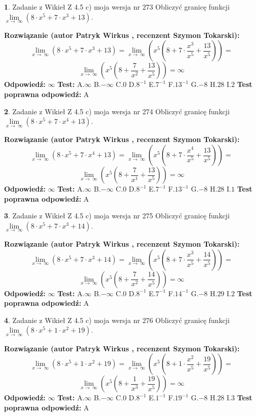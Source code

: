 \documentclass[12pt, a4paper]{article}
\theoremstyle{definition} %
\newtheorem{zad}{}
\newcommand{\zadStart}[1]{\begin{zad}#1\newline}
\newcommand{\zadStop}{\end{zad}}
\newcommand{\rozwStart}[2]{\noindent \textbf{Rozwiązanie (autor #1 , recenzent #2): }\newline}
\newcommand{\rozwStop}{\newline}
\newcommand{\odpStart}{\noindent \textbf{Odpowiedź:}\newline}
\newcommand{\odpStop}{\newline}
\newcommand{\testStart}{\noindent \textbf{Test:}\newline}
\newcommand{\testStop}{\newline}
\newcommand{\kluczStart}{\noindent \textbf{Test poprawna odpowiedź:}\newline}
\newcommand{\kluczStop}{\newline}
\begin{document}
\zadStart{Zadanie z Wikieł Z 4.5 c) moja wersja nr 273}
Obliczyć granicę funkcji  $\lim\limits_{x\to\ \infty}(8 \cdot x^{5}+7 \cdot x^{3}+13)$.
\zadStop
\rozwStart{Patryk Wirkus}{Szymon Tokarski}
$$\lim\limits_{x\to\ \infty}(8 \cdot x^{5}+7 \cdot x^{3}+13) = \lim\limits_{x\to\ \infty}(x^{5}(8 +7 \cdot \frac{x^{3}}{x^{5}}+\frac{13}{x^{5}})) =$$ $$\lim\limits_{x\to\ \infty}(x^{5}(8 +\frac{7}{x^{2}}+\frac{13}{x^{5}})) =\infty$$
\rozwStop
\odpStart
$\infty$
\odpStop
\testStart
A.$\infty$ B.$-\infty$ C.$0$ D.$8^{-1}$ E.$7^{-1}$
F.$13^{-1}$ G.$-8$
H.$28$
I.$2$
\testStop
\kluczStart
A
\kluczStop



\zadStart{Zadanie z Wikieł Z 4.5 c) moja wersja nr 274}
Obliczyć granicę funkcji  $\lim\limits_{x\to\ \infty}(8 \cdot x^{5}+7 \cdot x^{4}+13)$.
\zadStop
\rozwStart{Patryk Wirkus}{Szymon Tokarski}
$$\lim\limits_{x\to\ \infty}(8 \cdot x^{5}+7 \cdot x^{4}+13) = \lim\limits_{x\to\ \infty}(x^{5}(8 +7 \cdot \frac{x^{4}}{x^{5}}+\frac{13}{x^{5}})) =$$ $$\lim\limits_{x\to\ \infty}(x^{5}(8 +\frac{7}{x^{1}}+\frac{13}{x^{5}})) =\infty$$
\rozwStop
\odpStart
$\infty$
\odpStop
\testStart
A.$\infty$ B.$-\infty$ C.$0$ D.$8^{-1}$ E.$7^{-1}$
F.$13^{-1}$ G.$-8$
H.$28$
I.$1$
\testStop
\kluczStart
A
\kluczStop



\zadStart{Zadanie z Wikieł Z 4.5 c) moja wersja nr 275}
Obliczyć granicę funkcji  $\lim\limits_{x\to\ \infty}(8 \cdot x^{5}+7 \cdot x^{3}+14)$.
\zadStop
\rozwStart{Patryk Wirkus}{Szymon Tokarski}
$$\lim\limits_{x\to\ \infty}(8 \cdot x^{5}+7 \cdot x^{3}+14) = \lim\limits_{x\to\ \infty}(x^{5}(8 +7 \cdot \frac{x^{3}}{x^{5}}+\frac{14}{x^{5}})) =$$ $$\lim\limits_{x\to\ \infty}(x^{5}(8 +\frac{7}{x^{2}}+\frac{14}{x^{5}})) =\infty$$
\rozwStop
\odpStart
$\infty$
\odpStop
\testStart
A.$\infty$ B.$-\infty$ C.$0$ D.$8^{-1}$ E.$7^{-1}$
F.$14^{-1}$ G.$-8$
H.$29$
I.$2$
\testStop
\kluczStart
A
\kluczStop



\zadStart{Zadanie z Wikieł Z 4.5 c) moja wersja nr 276}
Obliczyć granicę funkcji  $\lim\limits_{x\to\ \infty}(8 \cdot x^{5}+1 \cdot x^{2}+19)$.
\zadStop
\rozwStart{Patryk Wirkus}{Szymon Tokarski}
$$\lim\limits_{x\to\ \infty}(8 \cdot x^{5}+1 \cdot x^{2}+19) = \lim\limits_{x\to\ \infty}(x^{5}(8 +1 \cdot \frac{x^{2}}{x^{5}}+\frac{19}{x^{5}})) =$$ $$\lim\limits_{x\to\ \infty}(x^{5}(8 +\frac{1}{x^{3}}+\frac{19}{x^{5}})) =\infty$$
\rozwStop
\odpStart
$\infty$
\odpStop
\testStart
A.$\infty$ B.$-\infty$ C.$0$ D.$8^{-1}$ E.$1^{-1}$
F.$19^{-1}$ G.$-8$
H.$28$
I.$3$
\testStop
\kluczStart
A
\kluczStop
\end{document}
